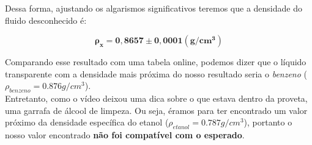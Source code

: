 Dessa forma, ajustando os algarismos significativos teremos que a densidade do fluido desconhecido é:

\[ \mathbf{\rho _x = 0,8657 \pm 0,0001 (g/cm^3)} \]

Comparando esse resultado com uma tabela online, podemos dizer que o líquido transparente com a densidade mais próxima do nosso resultado seria o \textit{benzeno} ($\rho _{benzeno} = 0.876 g/cm^3$).\\

Entretanto, como o vídeo deixou uma dica sobre o que estava dentro da proveta, uma garrafa de álcool de limpeza. Ou seja, éramos para ter encontrado um valor próximo da densidade específica do etanol ($\rho _{etanol} = 0.787 g/cm^3$), portanto o nosso valor encontrado \textbf{não foi compatível com o esperado}.\\

